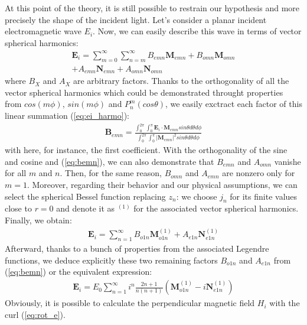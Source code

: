 \documentclass{article}
\numberwithin{equation}{section}
\begin{document}
At this point of the theory, it is still possible to restrain our hypothesis and more precisely the shape of the incident light. Let's consider a planar incident electromagnetic wave $E_{i}$. Now, we can easily describe this wave in terms of vector spherical harmonics:
\begin{equation}\label{eq:ei_harmo}
\begin{aligned}
    \textbf{E}_{i}=\sum_{m=0}^{\infty }\sum_{n=m}^{\infty }B_{emn}\textbf{M}_{emn}+B_{omn}\textbf{M}_{omn}\\
+A_{emn}\textbf{N}_{emn}+A_{omn}\textbf{N}_{omn}
\end{aligned}
\end{equation}
where $B_{X}$ and $A_{X}$ are arbitrary factors. Thanks to the orthogonality of all the vector spherical harmonics which could be demonstrated throught properties from $cos(m\phi)$, $sin(m\phi)$ and $P_{n}^{m}(cos\theta)$, we easily exctract each factor of this linear summation (\ref{eq:ei_harmo}):
\begin{align}\label{eq:bemn}
\textbf{B}_{emn}=\frac{\int_{0}^{2\pi}\int_{0}^{\pi}\textbf{E}_{i}\cdot \textbf{M}_{emn}sin\theta d\theta d\phi}{\int_{0}^{2\pi}\int_{0}^{\pi}|\textbf{M}_{emn}|^{2}sin\theta d\theta d\phi}
\end{align}
with here, for instance, the first coefficient. With the orthogonality of the sine and cosine and (\ref{eq:bemn}), we can also demonstrate that $B_{emn}$ and $A_{omn}$ vanishe for all $m$ and $n$. Then, for the same reason, $B_{omn}$ and $A_{emn}$ are nonzero only for $m=1$. Moreover, regarding their behavior and our physical assumptions, we can select the spherical Bessel function replacing $z_{n}$: we choose $j_{n}$ for its finite values close to $r=0$ and denote it as $^{(1)}$ for the associated vector spherical harmonics. Finally, we obtain:
\begin{align}
\textbf{E}_{i}=\sum_{n=1}^{\infty }B_{o1n}\textbf{M}^{(1)}_{o1n} + A_{e1n}\textbf{N}^{(1)}_{e1n}
\end{align}
Afterward, thanks to a bunch of properties from the associated Legendre functions, we deduce explicitly these two remaining factors $B_{o1n}$ and $A_{e1n}$ from (\ref{eq:bemn}) or the equivalent expression:
\begin{align}
\textbf{E}_{i}=E_{0}\sum_{n=1}^{\infty }i^{n}\frac{2n+1}{n(n+1)}(\textbf{M}^{(1)}_{o1n} - i\textbf{N}^{(1)}_{e1n})
\end{align}
Obviously, it is possible to calculate the perpendicular magnetic field $H_{i}$ with the curl (\ref{eq:rot_e}).
\end{document}
